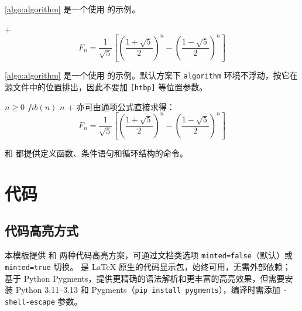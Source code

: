 \iftjalgorithmtwoe
  \cref{algo:algorithm} 是一个使用  的示例。

  \begin{algorithm}[H]
    \caption{计算斐波那契数列}\label{algo:algorithm}
    \;
    \Return {} + \;
    \begin{equation*}
      F_n = \frac{1}{\sqrt{5}}\left[\left(\frac{1+\sqrt{5}}{2}\right)^n - \left(\frac{1-\sqrt{5}}{2}\right)^n\right]
    \end{equation*}
  \end{algorithm}
\else
  \cref{algo:algorithm} 是一个使用  的示例。默认方案下 \texttt{algorithm} 环境不浮动，按它在源文件中的位置排出，因此不要加 \texttt{[htbp]} 等位置参数。

  \begin{algorithm}
    \caption{计算斐波那契数列}\label{algo:algorithm}
    \begin{algorithmic}[1]
      \Require $n \geq 0$
      \Ensure $fib(n)$
      \State \Return $n$
      \Else
      \State \Return {} + 
      \EndIf
      \EndFunction
      \State 亦可由通项公式直接求得：
      \begin{equation*}
        F_n = \frac{1}{\sqrt{5}}\left[\left(\frac{1+\sqrt{5}}{2}\right)^n - \left(\frac{1-\sqrt{5}}{2}\right)^n\right]
      \end{equation*}
    \end{algorithmic}
  \end{algorithm}
\fi

 和  都提供定义函数、条件语句和循环结构的命令。

\section{代码}

\subsection{代码高亮方式}

本模板提供  和  两种代码高亮方案，可通过文档类选项 \texttt{minted=false}（默认）或 \texttt{minted=true} 切换。 是 \LaTeX{} 原生的代码显示包，始终可用，无需外部依赖； 基于 Python Pygments，提供更精确的语法解析和更丰富的高亮效果，但需要安装 Python 3.11–3.13 和 Pygments（\texttt{pip install pygments}），编译时需添加 \texttt{-shell-escape} 参数。

